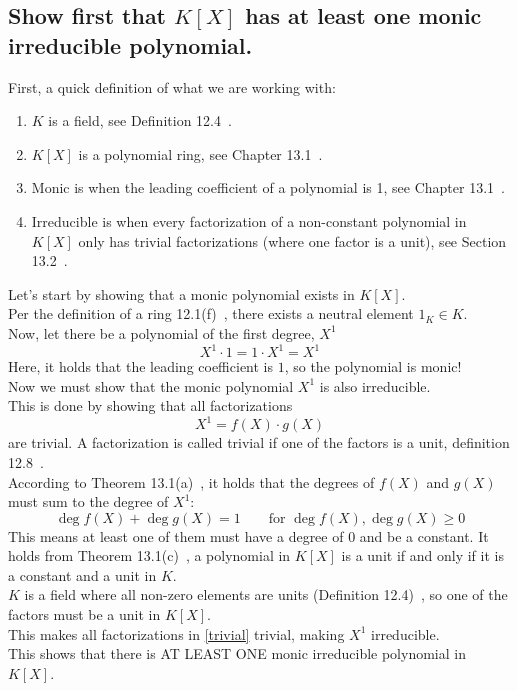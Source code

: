 \documentclass[12pt]{article}
\begin{document}
\subsection*{Show first that $K[X]$ has at least one monic irreducible polynomial.}
First, a quick definition of what we are working with:
\begin{enumerate}
    \item $K$ is a field, see Definition 12.4~\cite{Algebra}.
    \item $K[X]$ is a polynomial ring, see Chapter 13.1~\cite{Algebra}.
    \item Monic is when the leading coefficient of a polynomial is 1, see Chapter 13.1~\cite{Algebra}.
    \item Irreducible is when every factorization of a non-constant polynomial in $K[X]$ only has trivial factorizations (where one factor is a unit), see Section 13.2~\cite{Algebra}.
\end{enumerate}

Let's start by showing that a monic polynomial exists in $K[X]$.\\
Per the definition of a ring 12.1(f)~\cite{Algebra}, there exists a neutral element $1_K \in K$.\\
Now, let there be a polynomial of the first degree, $X^1$
\begin{equation*}
    X^1 \cdot 1 = 1 \cdot X^1 = X^1
\end{equation*} 
Here, it holds that the leading coefficient is $1$, so the polynomial is monic!\\
\newline
Now we must show that the monic polynomial $X^1$ is also irreducible.\\
This is done by showing that all factorizations
\begin{equation} \label{trivial}
    X^1 = f(X)\cdot g(X)
\end{equation}
are trivial. A factorization is called trivial if one of the factors is a unit, definition 12.8~\cite{Algebra}.\\
According to Theorem 13.1(a)~\cite{Algebra}, it holds that the degrees of $f(X)$ and $g(X)$ must sum to the degree of $X^1$:
\begin{equation*}
    \deg f(X) + \deg g(X) = 1 \qquad \text{for } \deg f(X), \deg g(X) \geq 0
\end{equation*}
This means at least one of them must have a degree of $0$ and be a constant. It holds from Theorem 13.1(c)~\cite{Algebra}, a polynomial in $K[X]$ is a unit if and only if it is a constant and a unit in $K$.\\
 $K$ is a field where all non-zero elements are units (Definition 12.4)~\cite{Algebra}, so one of the factors must be a unit in $K[X]$.\\
This makes all factorizations in \eqref{trivial} trivial, making $X^1$ irreducible.\\
This shows that there is AT LEAST ONE monic irreducible polynomial in $K[X]$.
\end{document}
